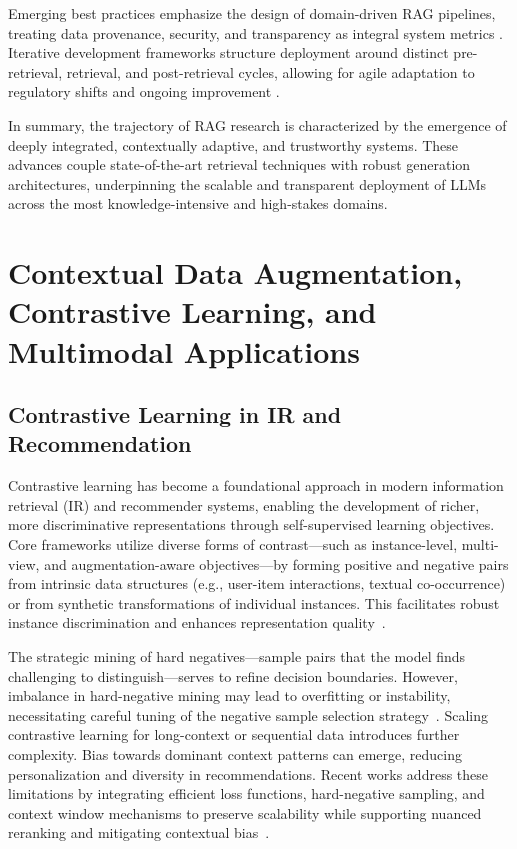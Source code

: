 \documentclass[11pt]{article}
\begin{document}
Emerging best practices emphasize the design of domain-driven RAG pipelines, treating data provenance, security, and transparency as integral system metrics \cite{ref63,ref64}. Iterative development frameworks structure deployment around distinct pre-retrieval, retrieval, and post-retrieval cycles, allowing for agile adaptation to regulatory shifts and ongoing improvement \cite{ref5,ref63}.

In summary, the trajectory of RAG research is characterized by the emergence of deeply integrated, contextually adaptive, and trustworthy systems. These advances couple state-of-the-art retrieval techniques with robust generation architectures, underpinning the scalable and transparent deployment of LLMs across the most knowledge-intensive and high-stakes domains.

\section{Contextual Data Augmentation, Contrastive Learning, and Multimodal Applications}

\subsection{Contrastive Learning in IR and Recommendation}

Contrastive learning has become a foundational approach in modern information retrieval (IR) and recommender systems, enabling the development of richer, more discriminative representations through self-supervised learning objectives. Core frameworks utilize diverse forms of contrast—such as instance-level, multi-view, and augmentation-aware objectives—by forming positive and negative pairs from intrinsic data structures (e.g., user-item interactions, textual co-occurrence) or from synthetic transformations of individual instances. This facilitates robust instance discrimination and enhances representation quality~\cite{ref12,ref14,ref15,ref16,ref18,ref19,ref20,ref21,ref23,ref24,ref25,ref26,ref27,ref30,ref32,ref33,ref36,ref37,ref38,ref43,ref45,ref54,ref55,ref62}. 

The strategic mining of hard negatives—sample pairs that the model finds challenging to distinguish—serves to refine decision boundaries. However, imbalance in hard-negative mining may lead to overfitting or instability, necessitating careful tuning of the negative sample selection strategy~\cite{ref14,ref16,ref37}. Scaling contrastive learning for long-context or sequential data introduces further complexity. Bias towards dominant context patterns can emerge, reducing personalization and diversity in recommendations. Recent works address these limitations by integrating efficient loss functions, hard-negative sampling, and context window mechanisms to preserve scalability while supporting nuanced reranking and mitigating contextual bias~\cite{ref14,ref15,ref16,ref32,ref33,ref36,ref37,ref43,ref54,ref55}.
\end{document}
